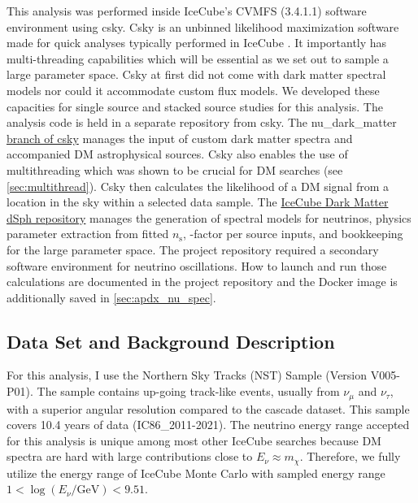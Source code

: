 This analysis was performed inside IceCube's CVMFS (3.4.1.1) software environment using csky.
Csky is an unbinned likelihood maximization software made for quick analyses typically performed in IceCube \cite{csky}.
It importantly has multi-threading capabilities which will be essential as we set out to sample a large parameter space.
Csky at first did not come with dark matter spectral models nor could it accommodate custom flux models.
We developed these capacities for single source and stacked source studies for this analysis.
The analysis code is held in a separate repository from csky.
The nu\_dark\_matter \href{https://github.com/icecube/csky/tree/nu\_dark\_matter}{branch of csky} manages the input of custom dark matter spectra and accompanied DM astrophysical sources.
Csky also enables the use of multithreading which was shown to be crucial for DM searches (see \cref{sec:multithread}).
Csky then calculates the likelihood of a DM signal from a location in the sky within a selected data sample.
The \href{https://github.com/salaza82/IceCube_dark_matter_dsph}{IceCube Dark Matter dSph repository} manages the generation of spectral models for neutrinos, physics parameter extraction from fitted $n_{\mathrm{s}}$, \J-factor per source inputs, and bookkeeping for the large parameter space.
The project repository required a secondary software environment for neutrino oscillations.
How to launch and run those calculations are documented in the project repository and the Docker image is additionally saved in \cref{sec:apdx_nu_spec}.

\subsection{Data Set and Background Description} \label{sec:icDM_data_bkgd}

For this analysis, I use the Northern Sky Tracks (NST) Sample (Version V005-P01).
The sample contains up-going track-like events, usually from $\nu_\mu$ and $\nu_\tau$, with a superior angular resolution compared to the cascade dataset.
This sample covers 10.4 years of data (IC86\_2011-2021).
The neutrino energy range accepted for this analysis is unique among most other IceCube searches because DM spectra are hard with large contributions close to $E_\nu \approx m_\chi$.
Therefore, we fully utilize the energy range of IceCube Monte Carlo with sampled energy range $1 < \log(E_\nu /\textrm{GeV}) < 9.51$.

